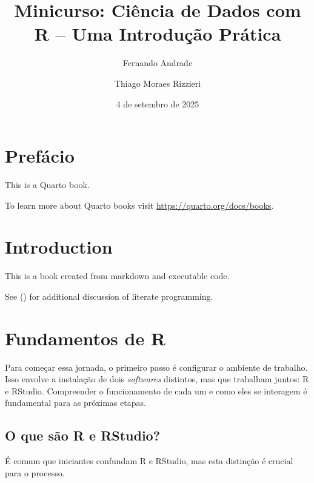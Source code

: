\documentclass[
  12pt,
  letterpaper,
  DIV=11,
  numbers=noendperiod]{scrreprt}
\title{Minicurso: Ciência de Dados com R -- Uma Introdução Prática}
\author{Fernando Andrade \and Thiago Moraes Rizzieri}
\date{4 de setembro de 2025}
\theoremstyle{definition}
\theoremstyle{exemplo}
\renewcommand*\contentsname{Índice}
\newcommand\contentsname{Índice}
\begin{document}
\maketitle

\renewcommand*\contentsname{Sumário}
{
\hypersetup{linkcolor=}
\setcounter{tocdepth}{2}
\tableofcontents
}


\chapter*{Prefácio}\label{prefuxe1cio}


This is a Quarto book.

To learn more about Quarto books visit
\url{https://quarto.org/docs/books}.


\chapter{Introduction}\label{introduction}

This is a book created from markdown and executable code.

See () for additional
discussion of literate programming.


\chapter{Fundamentos de R}\label{fundamentos-de-r}

Para começar essa jornada, o primeiro passo é configurar o ambiente de
trabalho. Isso envolve a instalação de dois \emph{softwares} distintos,
mas que trabalham juntos: R e RStudio. Compreender o funcionamento de
cada um e como eles se interagem é fundamental para as próximas etapas.

\section{O que são R e RStudio?}\label{o-que-suxe3o-r-e-rstudio}

É comum que iniciantes confundam R e RStudio, mas esta distinção é
crucial para o processo.
\end{document}
